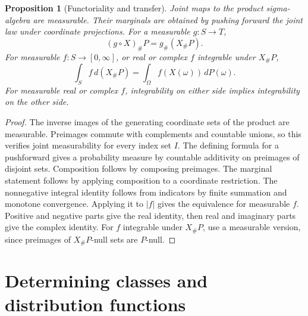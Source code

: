 \documentclass[11pt,oneside,openany]{book}
\theoremstyle{plain}
\newtheorem{proposition}[theorem]{Proposition}
\theoremstyle{definition}
\theoremstyle{remark}
\begin{document}
\begin{proposition}[Functoriality and transfer]
\label{thm:prob-transfer}
Joint maps to the product sigma-algebra are measurable. Their marginals
are obtained by pushing forward the joint law under coordinate
projections. For a measurable \(g\colon S\to T\),
\[
 (g\circ X)_\#P=g_\#(X_\#P).
\]
For measurable \(f\colon S\to[0,\infty]\), or real or complex \(f\)
integrable under \(X_\#P\),
\[
 \int_S f\,d(X_\#P)=\int_\Omega f(X(\omega))\,dP(\omega).
\]
For measurable real or complex \(f\), integrability on either side
implies integrability on the other side.
\end{proposition}
\begin{proof}
The inverse images of the generating coordinate sets of the product are
measurable. Preimages commute with complements and countable unions, so
this verifies joint measurability for every index set \(I\). The defining
formula for a pushforward gives a probability measure by countable
additivity on preimages of disjoint sets. Composition follows by
composing preimages. The marginal statement follows by applying
composition to a coordinate restriction. The nonnegative integral identity
follows from indicators by finite summation and monotone convergence.
Applying it to \(\lvert f\rvert\) gives the equivalence for measurable \(f\).
Positive and negative parts give the real identity, then real and imaginary
parts give the complex identity. For \(f\) integrable under \(X_\#P\), use a
measurable version, since preimages of \(X_\#P\)-null sets are \(P\)-null.
\end{proof}

\section{Determining classes and distribution functions}
\label{p01-03}
\end{document}
